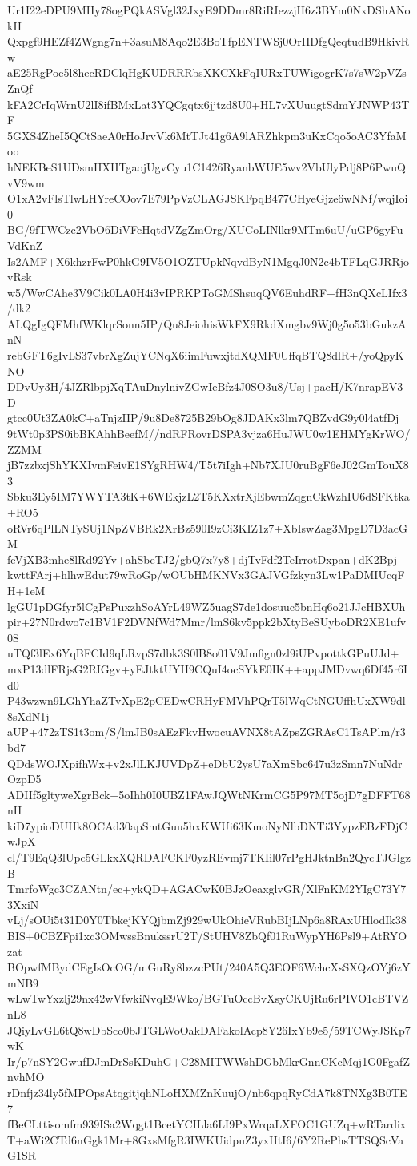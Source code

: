 Ur1I22eDPU9MHy78ogPQkASVgl32JxyE9DDmr8RiRIezzjH6z3BYm0NxDShANokH
Qxpgf9HEZf4ZWgng7n+3asuM8Aqo2E3BoTfpENTWSj0OrIIDfgQeqtudB9HkivRw
aE25RgPoe5l8hecRDClqHgKUDRRRbsXKCXkFqIURxTUWigogrK7s7sW2pVZsZnQf
kFA2CrIqWrnU2lI8ifBMxLat3YQCgqtx6jjtzd8U0+HL7vXUuugtSdmYJNWP43TF
5GXS4ZheI5QCtSaeA0rHoJrvVk6MtTJt41g6A9lARZhkpm3uKxCqo5oAC3YfaMoo
hNEKBeS1UDsmHXHTgaojUgvCyu1C1426RyanbWUE5wv2VbUlyPdj8P6PwuQvV9wm
O1xA2vFlsTlwLHYreCOov7E79PpVzCLAGJSKFpqB477CHyeGjze6wNNf/wqjIoi0
BG/9fTWCzc2VbO6DiVFcHqtdVZgZmOrg/XUCoLINlkr9MTm6uU/uGP6gyFuVdKnZ
Is2AMF+X6khzrFwP0hkG9IV5O1OZTUpkNqvdByN1MgqJ0N2c4bTFLqGJRRjovRsk
w5/WwCAhe3V9Cik0LA0H4i3vIPRKPToGMShsuqQV6EuhdRF+fH3nQXcLIfx3/dk2
ALQgIgQFMhfWKlqrSonn5IP/Qu8JeiohisWkFX9RkdXmgbv9Wj0g5o53bGukzAnN
rebGFT6gIvLS37vbrXgZujYCNqX6iimFuwxjtdXQMF0UffqBTQ8dlR+/yoQpyKNO
DDvUy3H/4JZRlbpjXqTAuDnylnivZGwIeBfz4J0SO3u8/Usj+pacH/K7nrapEV3D
gtcc0Ut3ZA0kC+aTnjzIIP/9u8De8725B29bOg8JDAKx3lm7QBZvdG9y0l4atfDj
9tWt0p3PS0ibBKAhhBeefM//ndRFRovrDSPA3vjza6HuJWU0w1EHMYgKrWO/ZZMM
jB7zzbxjShYKXIvmFeivE1SYgRHW4/T5t7iIgh+Nb7XJU0ruBgF6eJ02GmTouX83
Sbku3Ey5IM7YWYTA3tK+6WEkjzL2T5KXxtrXjEbwmZqgnCkWzhIU6dSFKtka+RO5
oRVr6qPlLNTySUj1NpZVBRk2XrBz590I9zCi3KIZ1z7+XbIswZag3MpgD7D3acGM
feVjXB3mhe8lRd92Yv+ahSbeTJ2/gbQ7x7y8+djTvFdf2TeIrrotDxpan+dK2Bpj
kwttFArj+hlhwEdut79wRoGp/wOUbHMKNVx3GAJVGfzkyn3Lw1PaDMIUcqFH+1eM
lgGU1pDGfyr5lCgPsPuxzhSoAYrL49WZ5uagS7de1dosuuc5bnHq6o21JJcHBXUh
pir+27N0rdwo7c1BV1F2DVNfWd7Mmr/lmS6kv5ppk2bXtyBeSUyboDR2XE1ufv0S
uTQf3lEx6YqBFCId9qLRvpS7dbk3S0lB8o01V9Jmfign0zl9iUPvpottkGPuUJd+
mxP13dlFRjsG2RIGgv+yEJtktUYH9CQuI4ocSYkE0IK++appJMDvwq6Df45r6Id0
P43wzwn9LGhYhaZTvXpE2pCEDwCRHyFMVhPQrT5lWqCtNGUffhUxXW9dl8sXdN1j
aUP+472zTS1t3om/S/lmJB0sAEzFkvHwocuAVNX8tAZpsZGRAsC1TsAPlm/r3bd7
QDdsWOJXpifhWx+v2xJlLKJUVDpZ+eDbU2ysU7aXmSbc647u3zSmn7NuNdrOzpD5
ADIIf5gltyweXgrBck+5oIhh0I0UBZ1FAwJQWtNKrmCG5P97MT5ojD7gDFFT68nH
kiD7ypioDUHk8OCAd30apSmtGuu5hxKWUi63KmoNyNlbDNTi3YypzEBzFDjCwJpX
cl/T9EqQ3lUpc5GLkxXQRDAFCKF0yzREvmj7TKIil07rPgHJktnBn2QycTJGlgzB
TmrfoWgc3CZANtn/ec+ykQD+AGACwK0BJzOeaxglvGR/XlFnKM2YIgC73Y73XxiN
vLj/sOUi5t31D0Y0TbkejKYQjbmZj929wUkOhieVRubBIjLNp6a8RAxUHlodIk38
BIS+0CBZFpi1xc3OMwssBnukssrU2T/StUHV8ZbQf01RuWypYH6Psl9+AtRYOzat
BOpwfMBydCEgIsOcOG/mGuRy8bzzcPUt/240A5Q3EOF6WchcXsSXQzOYj6zYmNB9
wLwTwYxzlj29nx42wVfwkiNvqE9Wko/BGTuOccBvXsyCKUjRu6rPIVO1cBTVZnL8
JQiyLvGL6tQ8wDbSco0bJTGLWoOakDAFakolAcp8Y26IxYb9e5/59TCWyJSKp7wK
Ir/p7nSY2GwufDJmDrSsKDuhG+C28MITWWshDGbMkrGnnCKcMqj1G0FgafZnvhMO
rDnfjz34ly5fMPOpsAtqgitjqhNLoHXMZnKuujO/nb6qpqRyCdA7k8TNXg3B0TE7
fBeCLttisomfm939ISa2Wqgt1BcetYCILla6LI9PxWrqaLXFOC1GUZq+wRTardix
T+aWi2CTd6nGgk1Mr+8GxsMfgR3IWKUidpuZ3yxHtI6/6Y2RePhsTTSQScVaG1SR
